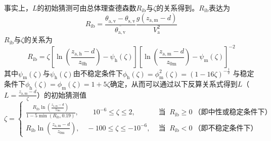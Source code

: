 事实上，$L$的初始猜测可由总体理查德森数$R_{\mathrm{ib}}$与$\zeta$的关系得到\citep{arya2001introduction}。$R_{\mathrm{ib}}$表达为
\begin{equation}\label{Rib}
  R_{\mathrm{i b}}=\frac{\theta_{\mathrm{a,v}}-\theta_{\mathrm{s,v}}}{\overline{\theta_{\mathrm{a,v}}}} \frac{g\left(z_{\mathrm{a, m}}-d\right)}{V_{\mathrm{a}}^{2}}
\end{equation}
$R_{\mathrm{ib}}$与$\zeta$的关系为
\begin{equation}
  R_{\mathrm{ib}}=\zeta\left[\ln{\left(\frac{z_{\mathrm{a,h}}-d}{z_{\mathrm{0h}}}\right)-\psi_{\mathrm h}(\zeta)}\right] \left[\ln{\left(\frac{z_{\mathrm{a,m}}-d}{z_{\mathrm{0m}}}\right)-\psi_{\mathrm m}(\zeta)}\right]^{-2}
\end{equation}
其中$\psi_{\mathrm m}(\zeta)$与$\psi_{\mathrm h}(\zeta)$由不稳定条件下$\phi_{\mathrm h}\left(\zeta\right)=\phi_{\mathrm m}^2\left(\zeta\right)=\left(1-16\zeta\right)^{-\frac{1}{2}}$
与稳定条件下$\phi_{\mathrm h}\left(\zeta\right)=\phi_{\mathrm m}\left(\zeta\right)=1+5\zeta$确定，从而可以通过以下反算关系式得到$L$（$L=\frac{z_{\mathrm{a,m}}-d}{\zeta}$）的初始猜测值
\begin{equation}\label{ZetaRib}
  \zeta=\begin{cases}
    \frac{R_{\mathrm{i b}} \ln \left(\frac{z_{\mathrm{a, m}}-d}{z_{\mathrm{0 m}}}\right)}{1-5 \min \left(R_{\mathrm{i b}}, 0.19\right)}, \qquad 10^{-6} \leqslant \zeta \leqslant 2, & \text{ 当 }\ R_{\mathrm{i b}} \geqslant 0\ \text{（即中性或稳定条件下）} \\
    R_{\mathrm{ib}} \ln \left(\frac{z_{\mathrm{a, m}}-d}{z_{\mathrm{0 m}}}\right),  \quad -100 \leqslant \zeta \leqslant-10^{-6}, & \text{ 当 }\ R_{\mathrm{i b}}<0\ \text{（即不稳定条件下）}
  \end{cases}
\end{equation}

